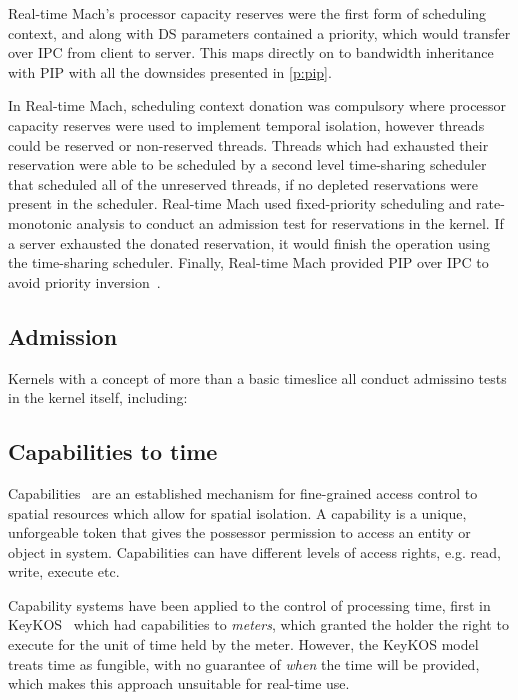 Real-time Mach's processor capacity reserves were the first form of scheduling context, and along
with \gls{DS} parameters contained a priority, which would transfer over \gls{IPC} from
client to server. This maps directly on to bandwidth inheritance with \gls{PIP} with all the
downsides presented in \cref{p:pip}. 









In Real-time Mach, scheduling context donation was compulsory where processor capacity reserves were
used to implement temporal isolation, however threads could be reserved or non-reserved threads.
Threads which had exhausted their reservation were able to be scheduled by a second level
time-sharing scheduler that scheduled all of the unreserved threads, if no depleted reservations
were present in the scheduler.  Real-time Mach used fixed-priority scheduling and rate-monotonic
analysis to conduct an admission test for reservations in the kernel.  If a server exhausted the
donated reservation, it would finish the operation using the time-sharing scheduler.  Finally,
Real-time Mach provided \gls{PIP} over \gls{IPC} to avoid priority inversion~\citep{Tokuda_NR_90}.


\subsection{Admission}

Kernels with a concept of more than a basic timeslice all conduct admissino tests in the kernel
itself, including: 

\subsection{Capabilities to time}
\label{s:capabilities}

Capabilities~\citep{Dennis_VanHorn_66} are an established mechanism for fine-grained access control
to spatial resources which allow for spatial isolation. A capability is a unique, unforgeable token
that gives the possessor permission to access an entity or object in system. Capabilities can have
different levels of access rights, e.g. read, write, execute etc.

Capability systems have been applied to the control of processing time, first in 
KeyKOS~\citep{Bomberger_FFHLS_92} which had capabilities to \emph{meters}, which granted the holder
the right to execute for the unit of time held by the meter.
However, the KeyKOS model treats time as fungible, with no guarantee
of \emph{when} the time will be provided, which makes this approach
unsuitable for real-time use.

